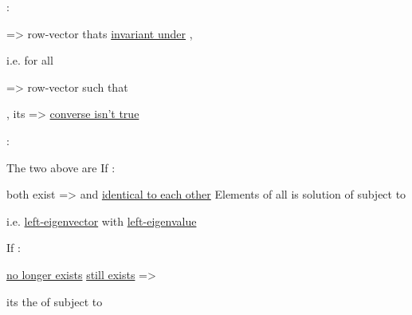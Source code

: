 \hSep

:
\begin{enumerate}
    \vItem {} =>
    row-vector \iMbox{\pi_{\infty}^{*}} thats \ul{invariant under} ,

    i.e.  for all 

    \vItem {} => row-vector \iMbox{\pi_{\infty}} such that
    \begin{enumerate}
        \vItem {}, its  => \ul{converse isn't true}
    \end{enumerate}

    \vItem {}:
    \begin{enumerate}
        \vItem The two above are 
        \vItem If :
        \begin{enumerate}
            \vItem {} both exist =>
              and \ul{identical to each other}
            \vItem Elements of \iMbox{\pi_{\infty}} all 
            \vItem \iMbox{\pi_{\infty}} is solution of  
            subject to 

            i.e. \ul{left-eigenvector} with \ul{left-eigenvalue} 
        \end{enumerate}

        \vItem If :
        \begin{enumerate}
            \vItem  {} \iMbox{\pi_{\infty}} \ul{no longer exists}
            \vItem {} \iMbox{\pi_{\infty}^{*}} \ul{still exists} =>

            its the  of 
            subject to 
        \end{enumerate}
    \end{enumerate}
\end{enumerate}

\hSep
